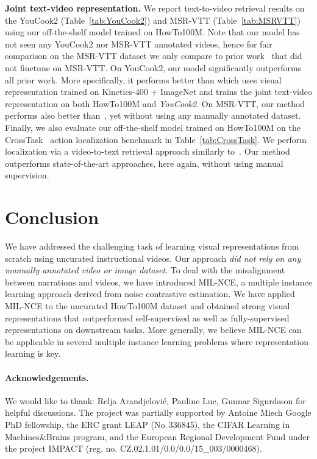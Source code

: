 \documentclass[10pt,twocolumn,letterpaper]{article}
\begin{document}
\noindent
\textbf{Joint text-video representation.}
We report text-to-video retrieval results on the YouCook2 (Table~\ref{tab:YouCook2}) and MSR-VTT (Table~\ref{tab:MSRVTT}) using our 
off-the-shelf model trained on HowTo100M.
Note that our model has not seen any YouCook2 nor MSR-VTT annotated videos, hence for fair comparison on the MSR-VTT dataset we only compare to prior work~\cite{miech19howto100m} that did not finetune on MSR-VTT.
On YouCook2, our model significantly outperforms all prior work.
More specifically, it performs better than \cite{miech19howto100m} which uses visual representation trained on Kinetics-400 + ImageNet and trains the joint text-video representation on both HowTo100M and \emph{YouCook2}.
On MSR-VTT, our method performs also better than~\cite{miech19howto100m}, yet without using any manually annotated dataset.
Finally, we also evaluate our off-the-shelf model trained on HowTo100M on the CrossTask~\cite{zhukov2019crosstask} action localization benchmark in Table~\ref{tab:CrossTask}.
We perform localization via a video-to-text retrieval approach similarly to~\cite{miech19howto100m}.
Our method outperforms state-of-the-art approaches, here again, without using manual supervision.


\section{Conclusion}
We have addressed the challenging task of learning visual representations from scratch using uncurated instructional videos.
Our approach \emph{did not rely on any manually annotated video or image dataset}.
To deal with the misalignment between narrations and videos, we have introduced MIL-NCE, a multiple instance learning approach derived from noise contrastive estimation.
We have applied MIL-NCE to the uncurated HowTo100M dataset and obtained strong visual representations that outperformed self-supervised as well as fully-supervised representations on downstream tasks.
More generally, we believe MIL-NCE can be applicable in several multiple instance learning problems where representation learning is key.
 
 
\paragraph{Acknowledgements.}
We would like to thank: Relja Arandjelovi\'c, Pauline Luc, Gunnar Sigurdsson for helpful discussions.
The project was partially supported by 
Antoine Miech Google PhD fellowship, the ERC grant LEAP (No.\,336845), the CIFAR 
Learning in Machines\&Brains program, and the European Regional 
Development Fund under the project IMPACT (reg. no. 
CZ.02.1.01/0.0/0.0/15\_003/0000468).
\end{document}
